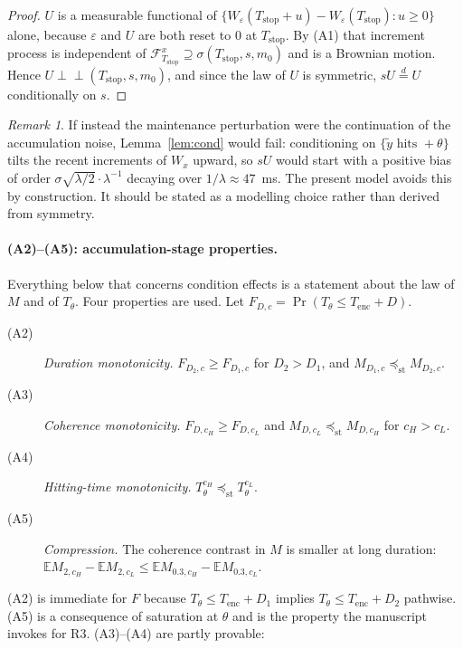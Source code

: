 \documentclass[11pt,a4paper]{article}
\newcommand{\E}{\mathbb{E}}
\newcommand{\Tstop}{T_{\text{stop}}}
\newcommand{\Mrv}{M}
\newcommand{\stle}{\preceq_{\mathrm{st}}}
\theoremstyle{plain}
\theoremstyle{remark}
\newtheorem{remark}{Remark}
\begin{document}
\begin{proof}
$U$ is a measurable functional of $\{W_\varepsilon(\Tstop+u)-W_\varepsilon(\Tstop):u\ge0\}$
alone, because $\varepsilon$ and $U$ are both reset to $0$ at $\Tstop$. By (A1) that
increment process is independent of $\mathcal F^{x}_{\Tstop}\supseteq\sigma(\Tstop,s,m_0)$
and is a Brownian motion. Hence $U\perp\!\!\!\perp(\Tstop,s,m_0)$, and since the law of
$U$ is symmetric, $sU\stackrel{d}{=}U$ conditionally on $s$.
\end{proof}

\begin{remark}
If instead the maintenance perturbation were the continuation of the accumulation noise,
Lemma~\ref{lem:cond} would fail: conditioning on $\{\tilde y \text{ hits }+\theta\}$ tilts
the recent increments of $W_x$ upward, so $sU$ would start with a positive bias of order
$\sigma\sqrt{\lambda/2}\cdot\lambda^{-1}$ decaying over $1/\lambda\approx47$~ms. The
present model avoids this by construction. It should be stated as a modelling choice
rather than derived from symmetry.
\end{remark}

\paragraph{(A2)--(A5): accumulation-stage properties.}
Everything below that concerns condition effects is a statement about the law of $\Mrv$
and of $T_\theta$. Four properties are used. Let
$F_{D,c}=\Pr(T_\theta\le T_{\text{enc}}+D)$.

\begin{description}
\item[(A2)] \emph{Duration monotonicity.} $F_{D_2,c}\ge F_{D_1,c}$ for $D_2>D_1$, and
$\Mrv_{D_1,c}\stle \Mrv_{D_2,c}$.
\item[(A3)] \emph{Coherence monotonicity.} $F_{D,c_H}\ge F_{D,c_L}$ and
$\Mrv_{D,c_L}\stle \Mrv_{D,c_H}$ for $c_H>c_L$.
\item[(A4)] \emph{Hitting-time monotonicity.} $T_\theta^{c_H}\stle T_\theta^{c_L}$.
\item[(A5)] \emph{Compression.} The coherence contrast in $\Mrv$ is smaller at long
duration: $\E\Mrv_{2,c_H}-\E\Mrv_{2,c_L}\le\E\Mrv_{0.3,c_H}-\E\Mrv_{0.3,c_L}$.
\end{description}

(A2) is immediate for $F$ because $T_\theta\le T_{\text{enc}}+D_1$ implies
$T_\theta\le T_{\text{enc}}+D_2$ pathwise. (A5) is a consequence of saturation at $\theta$
and is the property the manuscript invokes for R3. (A3)--(A4) are partly provable:
\end{document}
